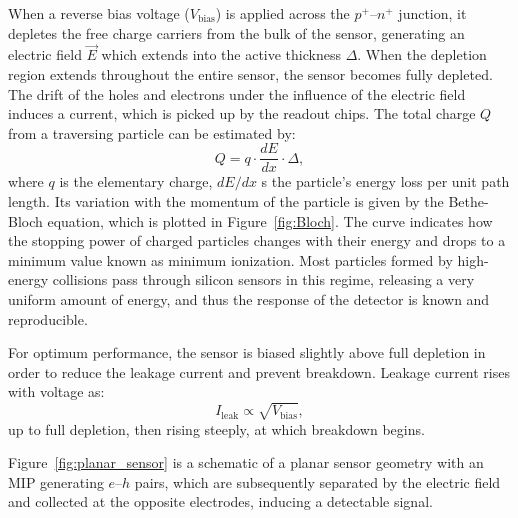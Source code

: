 When a reverse bias voltage ($V_{\text{bias}}$) is applied across the $p^+$--$n^+$ junction, it depletes the free charge carriers from the bulk of the sensor, generating an electric field $\vec{E}$ which extends into the active thickness $\Delta$. When the depletion region extends throughout the entire sensor, the sensor becomes fully depleted. The drift of the holes and electrons under the influence of the electric field induces a current, which is picked up by the readout chips. The total charge $Q$ from a traversing particle can be estimated by:
\begin{equation}
    Q = q \cdot \frac{dE}{dx} \cdot \Delta,
\end{equation}
where $q$ is the elementary charge, $dE/dx$ s the particle's energy loss per unit path length. Its variation with the momentum of the particle is given by the Bethe-Bloch equation, which is plotted in Figure~\ref{fig:Bloch}. The curve indicates how the stopping power of charged particles changes with their energy and drops to a minimum value known as minimum ionization. Most particles formed by high-energy collisions pass through silicon sensors in this regime, releasing a very uniform amount of energy, and thus the response of the detector is known and reproducible.

For optimum performance, the sensor is biased slightly above full depletion in order to reduce the leakage current and prevent breakdown. Leakage current rises with voltage as:
\begin{equation}
    I_{\text{leak}} \propto \sqrt{V_{\text{bias}}},
\end{equation}
up to full depletion, then rising steeply, at which breakdown begins.

Figure~\ref{fig:planar_sensor} is a schematic of a planar sensor geometry with an MIP generating $e$--$h$ pairs, which are subsequently separated by the electric field and collected at the opposite electrodes, inducing a detectable signal.

